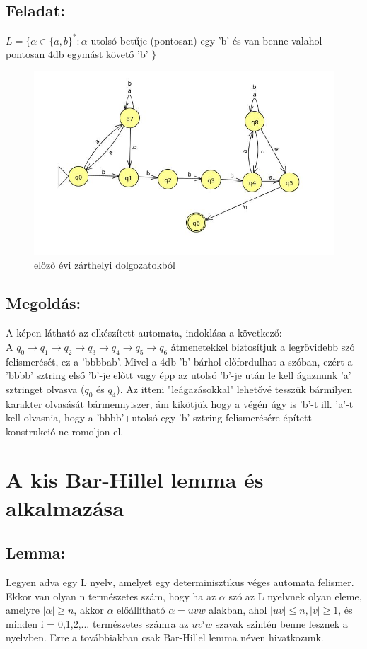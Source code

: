 \documentclass[12pt]{article}
\begin{document}
\subsection{Feladat:}
$ L=\{ \alpha \in \{a,b\}^* : \alpha $ utolsó betűje (pontosan) egy 'b' és van benne valahol pontosan 
4db egymást követő 'b' $ \} $
\begin{figure}[h]
  \centering
  \includegraphics[width=0.7\linewidth]{img/nd_ab.jpg} 
  \caption{előző évi zárthelyi dolgozatokból}
  \label{fig:your_label}
\end{figure}
\subsection{Megoldás:}
A képen látható az elkészített automata, indoklása a következő: \\
A $q_0 \rightarrow q_1 \rightarrow q_2 \rightarrow q_3 \rightarrow q_4 \rightarrow q_5 \rightarrow q_6$ 
átmenetekkel biztosítjuk a legrövidebb szó felismerését, ez a 'bbbbab'.
Mivel a 4db 'b' bárhol előfordulhat a szóban, ezért a 'bbbb' sztring első 'b'-je előtt vagy épp az utolsó 'b'-je
után le kell ágaznunk 'a' sztringet olvasva ($q_0$ és $q_4$). Az itteni "leágazásokkal" lehetővé tesszük bármilyen
karakter olvasását bármennyiszer, ám kikötjük hogy a végén úgy is 'b'-t ill. 'a'-t kell olvasnia, hogy a 
'bbbb'+utolsó egy 'b' sztring felismerésére épített konstrukció ne romoljon el.

\section{A kis Bar-Hillel lemma és alkalmazása}
\subsection{Lemma:}
Legyen adva egy L nyelv, amelyet egy determinisztikus véges automata felismer. Ekkor van olyan n természetes
szám, hogy ha az $\alpha$ szó az L nyelvnek olyan eleme, amelyre $|\alpha| \geq n$, akkor $\alpha$ előállítható
$\alpha=uvw$ alakban, ahol $|uv| \leq n, |v| \geq 1$, és minden i = 0,1,2,... természetes számra az $uv^iw$ szavak
szintén benne lesznek a nyelvben. Erre a továbbiakban csak Bar-Hillel lemma néven hivatkozunk.
\end{document}
